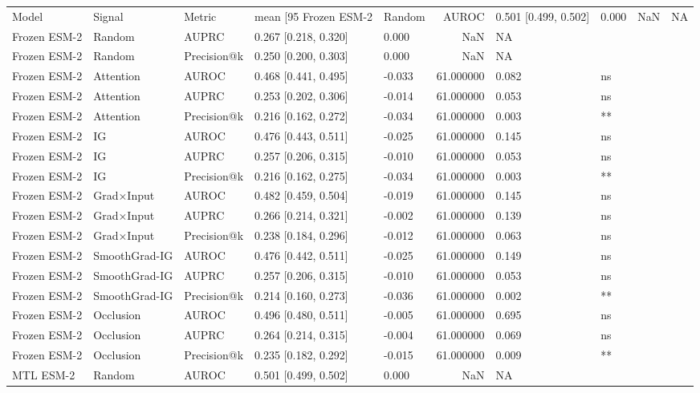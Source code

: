 \begin{tabular}{lllllrll}
\toprule
Model & Signal & Metric & mean [95%
\midrule
Frozen ESM-2 & Random & AUROC & 0.501 [0.499, 0.502] & 0.000 & NaN & NA &  \\
Frozen ESM-2 & Random & AUPRC & 0.267 [0.218, 0.320] & 0.000 & NaN & NA &  \\
Frozen ESM-2 & Random & Precision@k & 0.250 [0.200, 0.303] & 0.000 & NaN & NA &  \\
Frozen ESM-2 & Attention & AUROC & 0.468 [0.441, 0.495] & -0.033 & 61.000000 & 0.082 & ns \\
Frozen ESM-2 & Attention & AUPRC & 0.253 [0.202, 0.306] & -0.014 & 61.000000 & 0.053 & ns \\
Frozen ESM-2 & Attention & Precision@k & 0.216 [0.162, 0.272] & -0.034 & 61.000000 & 0.003 & ** \\
Frozen ESM-2 & IG & AUROC & 0.476 [0.443, 0.511] & -0.025 & 61.000000 & 0.145 & ns \\
Frozen ESM-2 & IG & AUPRC & 0.257 [0.206, 0.315] & -0.010 & 61.000000 & 0.053 & ns \\
Frozen ESM-2 & IG & Precision@k & 0.216 [0.162, 0.275] & -0.034 & 61.000000 & 0.003 & ** \\
Frozen ESM-2 & Grad×Input & AUROC & 0.482 [0.459, 0.504] & -0.019 & 61.000000 & 0.145 & ns \\
Frozen ESM-2 & Grad×Input & AUPRC & 0.266 [0.214, 0.321] & -0.002 & 61.000000 & 0.139 & ns \\
Frozen ESM-2 & Grad×Input & Precision@k & 0.238 [0.184, 0.296] & -0.012 & 61.000000 & 0.063 & ns \\
Frozen ESM-2 & SmoothGrad-IG & AUROC & 0.476 [0.442, 0.511] & -0.025 & 61.000000 & 0.149 & ns \\
Frozen ESM-2 & SmoothGrad-IG & AUPRC & 0.257 [0.206, 0.315] & -0.010 & 61.000000 & 0.053 & ns \\
Frozen ESM-2 & SmoothGrad-IG & Precision@k & 0.214 [0.160, 0.273] & -0.036 & 61.000000 & 0.002 & ** \\
Frozen ESM-2 & Occlusion & AUROC & 0.496 [0.480, 0.511] & -0.005 & 61.000000 & 0.695 & ns \\
Frozen ESM-2 & Occlusion & AUPRC & 0.264 [0.214, 0.315] & -0.004 & 61.000000 & 0.069 & ns \\
Frozen ESM-2 & Occlusion & Precision@k & 0.235 [0.182, 0.292] & -0.015 & 61.000000 & 0.009 & ** \\
MTL ESM-2 & Random & AUROC & 0.501 [0.499, 0.502] & 0.000 & NaN & NA &  \\

\end{tabular}
